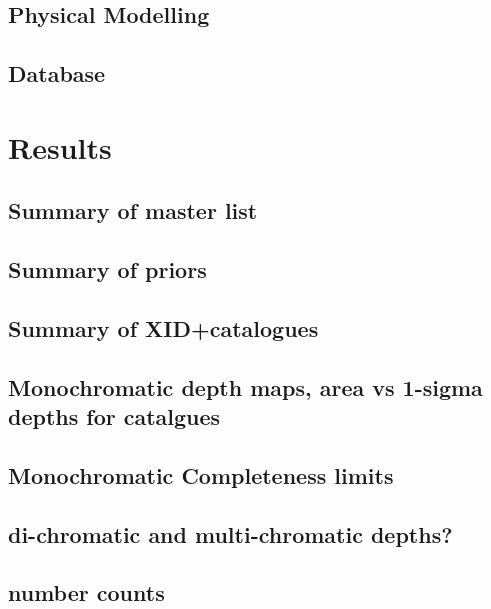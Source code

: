 \documentclass[usenatbib]{mnras}
\begin{document}
\subsection[Physical Modelling\\{color{red} A summary of Kassia's paper(s) and any details of exactly what is done for DR1 that is not included in those.}]{Physical Modelling}
\subsection[Database\\{color{red} needs some thought.}]{Database}

\section[Results\\ {\color{red}Being an assessment of the size and quality of the DR1 product, depths, areas, numbers of sources and redshifts distributions, etc.} ]{Results}
\subsection{Summary of master list}
\subsection{Summary of priors}
\subsection{Summary of XID+catalogues}

\subsection{Monochromatic depth maps, area vs 1-sigma depths for catalgues}
\subsection{Monochromatic Completeness limits }

\subsection{di-chromatic and multi-chromatic depths?}

\subsection{number counts}
\end{document}
